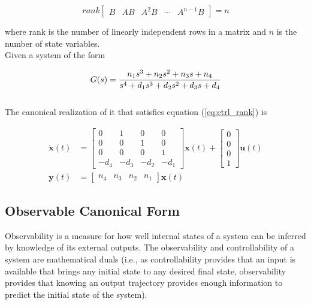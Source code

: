 \documentclass[10pt,conference,compsoc]{IEEEtran}
\newcommand{\mtx}[1] {\bm #1}
\begin{document}
\begin{equation}
  rank \left[
  \begin{array}{ccccc}
    B & AB & A^2B & \cdots & A^{n-1}B
  \end{array}
  \right] = n
  \label{eq:ctrl_rank}
\end{equation}

\noindent where rank is the number of linearly independent rows in a matrix and
$n$ is the number of state variables. \\

\noindent Given a system of the form

\begin{equation} \label{eq:ctrl_obsv_tf}
  G(s) = \frac{n_1 s^3 + n_2 s^2 + n_3 s + n_4}
    {s^4 + d_1 s^3 + d_2 s^2 + d_3 s + d_4} \\
\end{equation}
\\
\noindent The canonical realization of it that satisfies equation
(\ref{eq:ctrl_rank}) is

\begin{align}
  \dot{\mtx{x}}(t) &= \left[
  \begin{array}{cccc}
    0 & 1 & 0 & 0 \\
    0 & 0 & 1 & 0 \\
    0 & 0 & 0 & 1 \\
    -d_4 & -d_3 & -d_2 & -d_1
  \end{array}
  \right] \mtx{x}(t) + \left[
  \begin{array}{c}
    0 \\
    0 \\
    0 \\
    1
  \end{array}
  \right] \mtx{u}(t) \\
  \mtx{y}(t) &= \left[
  \begin{array}{cccc}
    n_4 & n_3 & n_2 & n_1
  \end{array}
  \right] \mtx{x}(t)
\end{align}

\subsection{Observable Canonical Form}

\noindent Observability is a measure for how well internal states of a system
can be inferred by knowledge of its external outputs. The observability and
controllability of a system are mathematical duals (i.e., as controllability
provides that an input is available that brings any initial state to any desired
final state, observability provides that knowing an output trajectory provides
enough information to predict the initial state of the system).
\end{document}
